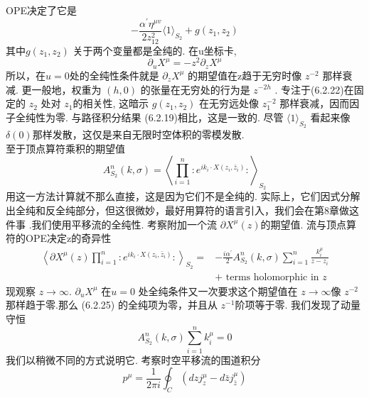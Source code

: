 OPE决定了它是
\begin{equation}
	-\frac{\alpha^{\prime} \eta^{\mu v}}{2 z_{12}^{2}}\langle 1\rangle_{S_{2}}+g\left(z_{1}, z_{2}\right)
\end{equation}
其中$g\left(z_{1}, z_{2}\right)$ 关于两个变量都是全纯的. 在u坐标卡,
\begin{equation}
	\partial_{u} X^{\mu}=-z^{2} \partial_{z} X^{\mu}
\end{equation}
所以，在$u=0$处的全纯性条件就是 $\partial_{z} X^{\mu}$ 的期望值在z趋于无穷时像 $z^{-2}$ 那样衰减. 更一般地，权重为 $(h, 0)$ 的张量在无穷处的行为是 $z^{-2 h}$ . 专注于(6.2.22)在固定的 $z_{2}$ 处对 $z_{1}$的相关性, 这暗示 $g\left(z_{1}, z_{2}\right)$ 在无穷远处像 $z_{1}^{-2}$ 那样衰减，因而因子全纯性为零. 与路径积分结果 (6.2.19)相比，这是一致的. 尽管 $\langle 1\rangle_{S_{2}}$ 看起来像 $\delta(0) $那样发散，这仅是来自无限时空体积的零模发散.\\
至于顶点算符乘积的期望值
\begin{equation}
	A_{S_{2}}^{n}(k, \sigma)=\left\langle\prod_{i=1}^{n}: e^{i k_{i} \cdot X\left(z_{i}, \bar{z}_{i}\right)}:\right\rangle_{S_{2}}
\end{equation}
用这一方法计算就不那么直接，这是因为它们不是全纯的. 实际上，它们因式分解出全纯和反全纯部分，但这很微妙，最好用算符的语言引入，我们会在第8章做这件事 .我们使用平移流的全纯性. 考察附加一个流 $\partial X^{\mu}(z)$的期望值. 流与顶点算符的OPE决定z的奇异性
\begin{equation}
	\begin{aligned}
		\left\langle\partial X^{\mu}(z) \prod_{i=1}^{n}: e^{i k_{i} \cdot X\left(z_{i}, \bar{z}_{i}\right)}:\right\rangle_{S_{2}}=&-\frac{i \alpha^{\prime}}{2} A_{S_{2}}^{n}(k, \sigma) \sum_{i=1}^{n} \frac{k_{i}^{\mu}}{z-z_{i}} \\
		&+\text { terms holomorphic in } z
	\end{aligned}
\end{equation}
现观察 $z \rightarrow \infty$.  $\partial_{u} X^{\mu}$ 在$u=0$ 处全纯条件又一次要求这个期望值在 $z \rightarrow \infty$像 $z^{-2}$ 那样趋于零.那么 (6.2.25) 的全纯项为零，并且从 $z^{-1}$阶项等于零. 我们发现了动量守恒
\begin{equation}
	A_{S_{2}}^{n}(k, \sigma) \sum_{i=1}^{n} k_{i}^{\mu}=0
\end{equation}
我们以稍微不同的方式说明它. 考察时空平移流的围道积分
\begin{equation}
	p^{\mu}=\frac{1}{2 \pi i} \oint_{C}\left(d z j_{z}^{\mu}-d \bar{z} j_{\bar{z}}^{\mu}\right)
\end{equation}
